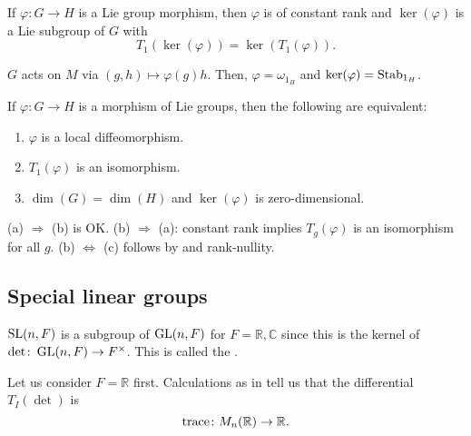 \documentclass[12pt]{article}
\begin{document}
\begin{cor} \label{cor:image-kernel-morphism-properties}
	If $\varphi \colon G \to H$ is a Lie group morphism, then $\varphi$ is of constant rank and $\ker(\varphi)$ is a Lie subgroup of $G$ with 
	\begin{equation*} 
		T_{1}(\ker(\varphi)) = \ker(T_{1}(\varphi)).
	\end{equation*}
\end{cor}
\begin{sketch} 
	$G$ acts on $M$ via $(g, h) \mapsto \varphi(g) h$. Then, $\varphi = \omega_{1_{H}}$ and $\ker(\varphi) = \operatorname{Stab}_{1_{H}}$.
\end{sketch}

\begin{cor} \label{cor:local-diffeo-characterisation}
	If $\varphi \colon G \to H$ is a morphism of Lie groups, then the following are equivalent:
	\begin{enumerate}[label=(\alph*)]
		\item $\varphi$ is a local diffeomorphism.
		\item $T_{1}(\varphi)$ is an isomorphism.
		\item $\dim(G) = \dim(H)$ and $\ker(\varphi)$ is zero-dimensional.
	\end{enumerate}
\end{cor}
\begin{sketch}
	(a) $\Rightarrow$ (b) is OK. \newline
	(b)	$\Rightarrow$ (a): constant rank implies $T_{g}(\varphi)$ is an isomorphism for all $g$. \newline
	(b) $\Leftrightarrow$ (c) follows by  and rank-nullity.
\end{sketch}

\subsection{Special linear groups} \label{subsec:SL-subgroup}

$\operatorname{SL}(n, F)$ is a subgroup of $\operatorname{GL}(n, F)$ for $F = \mathbb{R}, \mathbb{C}$ since this is the kernel of $\det \colon \operatorname{GL}(n, F) \to F^{\times}$.
This is called the .

Let us consider $F = \mathbb{R}$ first. 
Calculations as in  tell us that the differential $T_{I}(\det)$ is
\begin{equation*} 
	\operatorname{trace} \colon M_{n}(\mathbb{R}) \to \mathbb{R}.
\end{equation*}
\end{document}
